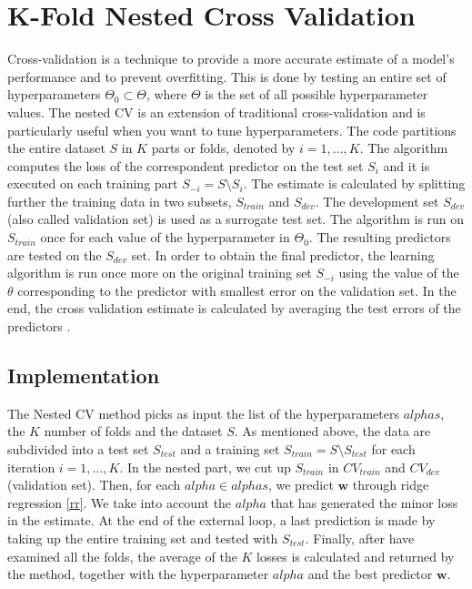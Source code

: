 \documentclass{article}
\begin{document}
\section{K-Fold Nested Cross Validation}
Cross-validation is a technique to provide a more accurate estimate of a model's performance and to prevent overfitting. This is done by testing an entire set of hyperparameters $\Theta_0 \subset \Theta$, where $\Theta$ is the set of all possible hyperparameter values. The nested CV is an extension of traditional cross-validation and is particularly useful when you want to tune hyperparameters.
The code partitions the entire dataset $S$ in $K$ parts or folds, denoted by $i = 1,\dots,K$. The algorithm computes the loss of the correspondent predictor on the test set $S_i$ and it is executed on each training part $S_{-i} = S \setminus S_{i}$. The estimate is calculated by splitting further the training data in two subsets, $S_{train}$ and $S_{dev}$. The development set $S_{dev}$ (also called validation set) is used as a surrogate test set. The algorithm is run on $S_{train}$ once for each value of the hyperparameter in $\Theta_0$. The resulting predictors are tested on the $S_{dev}$ set. In order to obtain the final predictor, the learning algorithm is run once more on the original training set $S_{-i}$ using the value of the $\theta$ corresponding to the predictor with smallest error on the validation set. In the end, the cross validation estimate is calculated by averaging the test errors of the predictors \cite{profcv}. \newline

\subsection{Implementation}
The Nested CV method picks as input the list of the hyperparameters $alphas$, the $K$ number of folds and the dataset $S$. As mentioned above, the data are subdivided into a test set $S_{test}$ and a training set $S_{train} = S \setminus S_{test}$ for each iteration $i = 1, \dots, K$. In the nested part, we cut up $S_{train}$ in $CV_{train}$ and $CV_{dev}$ (validation set). Then, for each $alpha \in alphas$, we predict $\boldsymbol{w}$ through ridge regression \eqref{rr}. We take into account the $alpha$ that has generated the minor loss in the estimate. At the end of the external loop, a last prediction is made by taking up the entire training set and tested with $S_{test}$.
Finally, after have examined all the folds, the average of the $K$ losses is calculated and returned by the method, together with the hyperparameter $alpha$ and the best predictor $\boldsymbol{w}$. 
\end{document}
